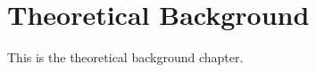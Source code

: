 \documentclass[../main.tex]{subfiles}
\begin{document}
\chapter{Theoretical Background}

This is the theoretical background chapter.
\end{document}
